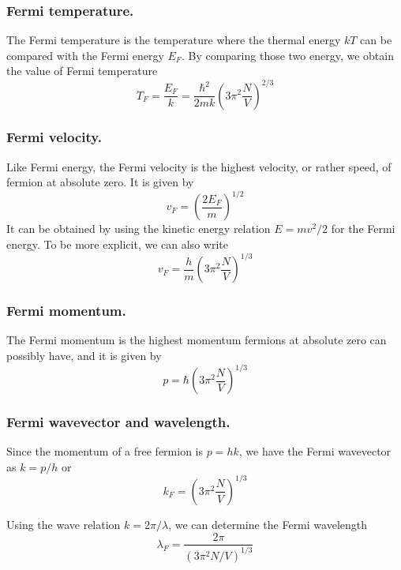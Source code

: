 \documentclass[../../../Main.tex]{subfiles}
\begin{document}
\subsubsection*{Fermi temperature.} The Fermi temperature is the temperature where the thermal energy $kT$ can be compared with the Fermi energy $E_F$. By comparing those two energy, we obtain the value of Fermi temperature
\begin{equation*}
    T_F=\frac{E_F}{k}=\frac{\hbar^2}{2mk}\left(3\pi^2\frac{N}{V}\right)^{2/3}
\end{equation*}

\subsubsection*{Fermi velocity.} Like Fermi energy, the Fermi velocity is the highest velocity, or rather speed, of fermion at absolute zero. It is given by 
\begin{equation*}
    v_F=\left(\frac{2E_F}{m}\right)^{1/2}
\end{equation*}
It can be obtained by using the kinetic energy relation $E=mv^2/2$ for the Fermi energy. To be more explicit, we can also write
\begin{equation*}
    v_F=\frac{h}{m}\left(3\pi^2\frac{N}{V}\right)^{1/3}
\end{equation*}

\subsubsection*{Fermi momentum.} The Fermi momentum is the highest momentum fermions at absolute zero can possibly have, and it is given by 
\begin{equation*}
    p=\hbar\left(3\pi^2\frac{N}{V}\right)^{1/3}
\end{equation*}

\subsubsection*{Fermi wavevector and wavelength.} Since the momentum of a free fermion is $p=hk$, we have the Fermi wavevector as $k=p/h$ or 
\begin{equation*}
    k_F=\left(3\pi^2\frac{N}{V}\right)^{1/3}
\end{equation*}

Using the wave relation $k=2\pi/\lambda$, we can determine the Fermi wavelength
\begin{equation*}
    \lambda_F=\frac{2\pi}{\left(3\pi^2N/V\right)^{1/3}}
\end{equation*}
\end{document}
